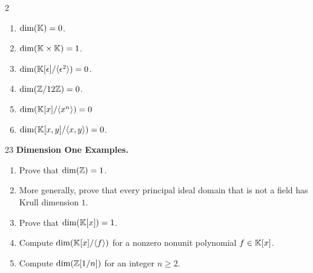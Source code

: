 \documentclass[Notebook.tex]{subfiles}
\begin{document}
\begin{solution}
    \bbni
    \begin{multicols}{2}
    \begin{enumerate}
        \item $\dim (\mathbb K) = 0$.
        \item $\dim (\mathbb K\times \mathbb K) = 1$.
        \item $\dim(\mathbb K[\epsilon]/\langle \epsilon^2\rangle) = 0$.
        \item $\dim(\mathbb Z/12\mathbb Z) = 0$.
        \item $\dim(\mathbb K[x]/\langle x^n\rangle) = 0$
        \item $\dim(\mathbb K[x,y]/\langle x,y\rangle) = 0$.
    \end{enumerate}
    \end{multicols}
\end{solution}

\newpage

\begin{problem}{23} 
    \textbf{Dimension One Examples.} 

    \begin{enumerate}
        \item Prove that $\dim(\mathbb Z)=1$.
        \item More generally, prove that every principal ideal domain that is not a field has Krull dimension $1$.
        \item Prove that $\dim(\mathbb K[x])=1$.
        \item Compute $\dim(\mathbb K[x]/\langle f\rangle)$ for a nonzero nonunit polynomial $f\in \mathbb K[x]$.
        \item Compute $\dim(\mathbb Z[1/n])$ for an integer $n\geq 2$.
    \end{enumerate}
\end{problem}
\end{document}
